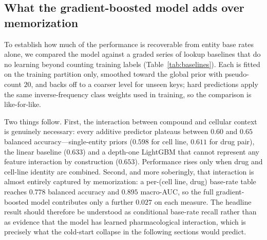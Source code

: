 \documentclass[11pt]{article}
\begin{document}
\subsection{What the gradient-boosted model adds over memorization}
To establish how much of the performance is recoverable from entity base rates alone, we compared the
model against a graded series of lookup baselines that do no learning beyond counting training labels
(Table~\ref{tab:baselines}). Each is fitted on the training partition only, smoothed toward the global
prior with pseudo-count $20$, and backs off to a coarser level for unseen keys; hard predictions apply
the same inverse-frequency class weights used in training, so the comparison is like-for-like.

Two things follow. First, the interaction between compound and cellular context is genuinely necessary:
every additive predictor plateaus between $0.60$ and $0.65$ balanced accuracy---single-entity priors
($0.598$ for cell line, $0.611$ for drug pair), the linear baseline ($0.633$) and a depth-one LightGBM
that cannot represent any feature interaction by construction ($0.653$). Performance rises only when
drug and cell-line identity are combined. Second, and more soberingly, that interaction is almost
entirely captured by memorization: a per-(cell line, drug) base-rate table reaches $0.778$ balanced
accuracy and $0.895$ macro-AUC, so the full gradient-boosted model contributes only a further $0.027$
on each measure. The headline result should therefore be understood as conditional base-rate recall
rather than as evidence that the model has learned pharmacological interaction, which is precisely what
the cold-start collapse in the following sections would predict.
\end{document}
